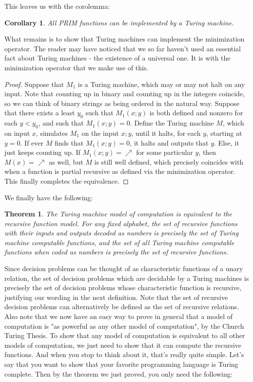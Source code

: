 \documentclass{article}
\theoremstyle{definition}
\theoremstyle{plain}
\theoremstyle{theorem}
\newtheorem{theorem}{Theorem}[section]
\newtheorem{corollary}{Corollary}[section]
\begin{document}
This leaves us with the corolemma:
\begin{corollary}
    All PRIM functions can be implemented by a Turing machine.
\end{corollary}
What remains is to show that Turing machines can implement the minimization operator. The reader may have noticed that we so far haven't used an essential fact about Turing machines - the existence of a universal one. It is with the minimization operator that we make use of this. \par 
\begin{proof}
Suppose that $M_1$ is a Turing machine, which may or may not halt on any input. Note that counting up in binary and counting up in the integers coincide, so we can think of binary strings as being ordered in the natural way. Suppose that there exists a least $y_0$ such that $M_1(x;y)$ is both defined and nonzero for each $y<y_0$, and such that $M_1(x;y)=0$. Define the Turing machine $M$, which on input $x$, simulates $M_1$ on the input $x;y$, until it halts, for each $y$, starting at $y=0$. If ever $M$ finds that $M_1(x;y)=0$, it halts and outputs that $y$. Else, it just keeps counting up. If $M_1(x;y)=\nearrow$ for some particular $y$, then $M(x)=\nearrow$ as well, but $M$ is still well defined, which precisely coincides with when a function is partial recursive as defined via the minimization operator. This finally completes the equivalence.
\end{proof}
We finally have the following:
\begin{theorem}
    \par The Turing machine model of computation is equivalent to the recursive function model. For any fixed alphabet, the set of recursive functions with their inputs and outputs decoded as numbers is precisely the set of Turing machine computable functions, and the set of all Turing machine computable functions when coded as numbers is precisely the set of recursive functions.
\end{theorem}
Since decision problems can be thought of as characteristic functions of a unary relation, the set of decision problems which are decidable by a Turing machines is precisely the set of decision problems whose characteristic function is recursive, justifying our wording in the next definition.
Note that the set of recursive decision problems can alternatively be defined as the set of recursive relations. Also note that we now have an easy way to prove in general that a model of computation is "as powerful as any other model of computation", by the Church Turing Thesis. To show that any model of computation is equivalent to all other models of computation, we just need to show that it can compute the recursive functions. And when you stop to think about it, that's really quite simple. Let's say that you want to show that your favorite programming language is Turing complete. Then by the theorem we just proved, you only need the following:
\end{document}
